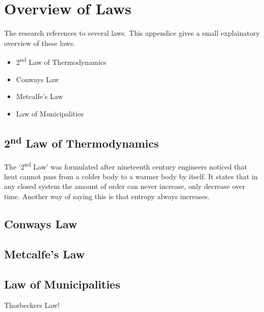 \chapter{Overview of Laws}

The research references to several laws. This appendice gives a small explainatory overview of these laws.

\begin{itemize}
	\item{2\textsuperscript{nd} Law of Thermodynamics}
	\item{Conways Law}
	\item{Metcalfe's Law}
	\item{Law of Municipalities}
\end{itemize}

\section{2\textsuperscript{nd} Law of Thermodynamics}
\label{sec:appendix2ndlawthermodynamics}
The ‘2\textsuperscript{nd} Law’ was formulated after nineteenth century engineers noticed that heat cannot pass from a colder body to a warmer body by itself. It states that in any closed system the amount of order can never increase, only decrease over time. Another way of saying this is that entropy always increases.

\section{Conways Law}

\section{Metcalfe's Law}

\section{Law of Municipalities}

Thorbeckers Law!
